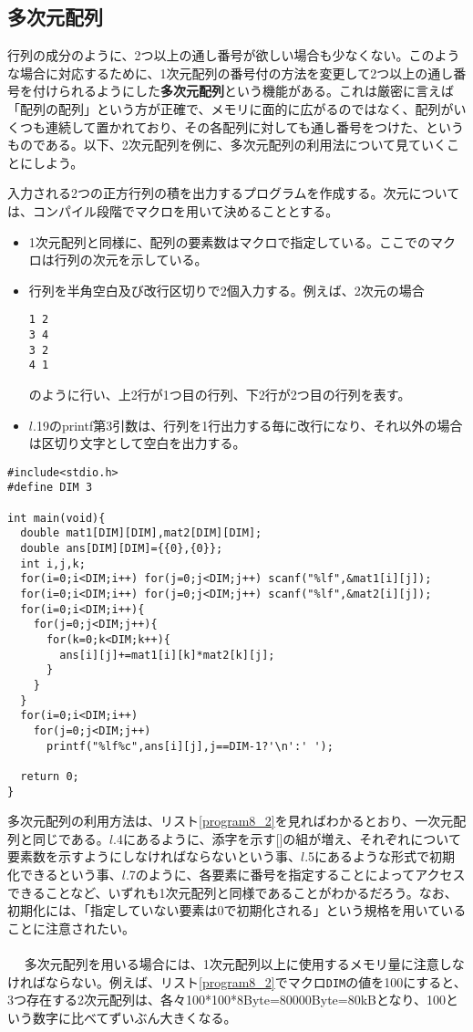 \subsection{多次元配列}
行列の成分のように、2つ以上の通し番号が欲しい場合も少なくない。このような場合に対応するために、1次元配列の番号付の方法を変更して2つ以上の通し番号を付けられるようにした\textbf{多次元配列}という機能がある。これは厳密に言えば「配列の配列」という方が正確で、メモリに面的に広がるのではなく、配列がいくつも連続して置かれており、その各配列に対しても通し番号をつけた、というものである。以下、2次元配列を例に、多次元配列の利用法について見ていくことにしよう。
\begin{boxnote}
入力される2つの正方行列の積を出力するプログラムを作成する。次元については、コンパイル段階でマクロを用いて決めることとする。
\end{boxnote}
\begin{boxnote}
\begin{itemize}
\item 1次元配列と同様に、配列の要素数はマクロで指定している。ここでのマクロは行列の次元を示している。
\item 行列を半角空白及び改行区切りで2個入力する。例えば、2次元の場合
\begin{verbatim}
1 2
3 4
3 2
4 1
\end{verbatim}
のように行い、上2行が1つ目の行列、下2行が2つ目の行列を表す。
\item $l$.19のprintf第3引数は、行列を1行出力する毎に改行になり、それ以外の場合は区切り文字として空白を出力する。
\end{itemize}
\begin{lstlisting}[caption=正方行列の積,label=program8_2]
#include<stdio.h>
#define DIM 3

int main(void){
  double mat1[DIM][DIM],mat2[DIM][DIM];
  double ans[DIM][DIM]={{0},{0}};
  int i,j,k;
  for(i=0;i<DIM;i++) for(j=0;j<DIM;j++) scanf("%lf",&mat1[i][j]);
  for(i=0;i<DIM;i++) for(j=0;j<DIM;j++) scanf("%lf",&mat2[i][j]);
  for(i=0;i<DIM;i++){
    for(j=0;j<DIM;j++){
      for(k=0;k<DIM;k++){
        ans[i][j]+=mat1[i][k]*mat2[k][j];
      }
    }
  }
  for(i=0;i<DIM;i++)
    for(j=0;j<DIM;j++)
      printf("%lf%c",ans[i][j],j==DIM-1?'\n':' ');
  
  return 0;
}
\end{lstlisting}
\end{boxnote}
多次元配列の利用方法は、リスト\ref{program8_2}を見ればわかるとおり、一次元配列と同じである。$l$.4にあるように、添字を示す[]の組が増え、それぞれについて要素数を示すようにしなければならないという事、$l$.5にあるような形式で初期化できるという事、$l$.7のように、各要素に番号を指定することによってアクセスできることなど、いずれも1次元配列と同様であることがわかるだろう。なお、初期化には、「指定していない要素は0で初期化される」という規格を用いていることに注意されたい。
\\ \\　
多次元配列を用いる場合には、1次元配列以上に使用するメモリ量に注意しなければならない。例えば、リスト\ref{program8_2}でマクロ\verb|DIM|の値を100にすると、3つ存在する2次元配列は、各々100*100*8Byte=80000Byte=80kBとなり、100という数字に比べてずいぶん大きくなる。


